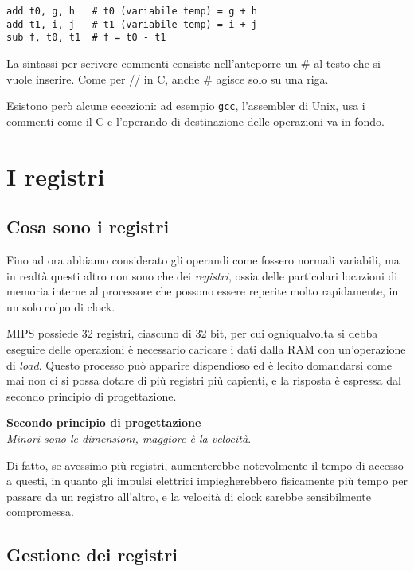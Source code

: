 \begin{verbatim}
add t0, g, h   # t0 (variabile temp) = g + h
add t1, i, j   # t1 (variabile temp) = i + j
sub f, t0, t1  # f = t0 - t1
\end{verbatim}

La sintassi per scrivere commenti consiste nell'anteporre un \# al testo che si vuole inserire. Come per // in C, anche \# agisce solo su una riga.

Esistono però alcune eccezioni: ad esempio \texttt{gcc}, l'assembler di Unix, usa i commenti come il C e l'operando di destinazione delle operazioni va in fondo.

\section{I registri}

\subsection*{Cosa sono i registri}
Fino ad ora abbiamo considerato gli operandi come fossero normali variabili, ma in realtà questi altro non sono che dei \emph{registri}, ossia delle particolari locazioni di memoria interne al processore che possono essere reperite molto rapidamente, in un solo colpo di clock.

MIPS possiede 32 registri, ciascuno di 32 bit, per cui ogniqualvolta si debba eseguire delle operazioni è necessario caricare i dati dalla RAM con un'operazione di \emph{load}. Questo processo può apparire dispendioso ed è lecito domandarsi come mai non ci si possa dotare di più registri più capienti, e la risposta è espressa dal secondo principio di progettazione.

\vspace{8pt}
\begin{tcolorbox}
\centering
\textbf{Secondo principio di progettazione}\\
\emph{Minori sono le dimensioni, maggiore è la velocità}.
\end{tcolorbox}
\vspace{5pt}

Di fatto, se avessimo  più registri, aumenterebbe notevolmente il tempo di accesso a questi, in quanto gli impulsi elettrici impiegherebbero fisicamente più tempo per passare da un registro all'altro, e la velocità di clock sarebbe sensibilmente compromessa.

\subsection*{Gestione dei registri}

